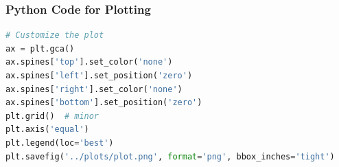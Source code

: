 \documentclass{beamer}
\theoremstyle{remark}
\numberwithin{equation}{section}
\begin{document}
\begin{frame}[fragile]
\frametitle{Python Code for Plotting}
\begin{lstlisting}[language=Python]
# Customize the plot
ax = plt.gca()
ax.spines['top'].set_color('none')
ax.spines['left'].set_position('zero')
ax.spines['right'].set_color('none')
ax.spines['bottom'].set_position('zero')
plt.grid()  # minor
plt.axis('equal')
plt.legend(loc='best')
plt.savefig('../plots/plot.png', format='png', bbox_inches='tight')
\end{lstlisting}
\end{frame}
\end{document}
